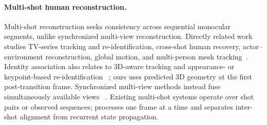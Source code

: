 \paragraph{Multi-shot human reconstruction.}
Multi-shot reconstruction seeks consistency across sequential monocular
segments, unlike synchronized multi-view reconstruction. Directly related work
studies TV-series tracking and re-identification, cross-shot human recovery,
actor--environment reconstruction, global motion, and multi-person mesh
tracking~\citep{pavlakos2022tvtracking,pavlakos2022multishot,pavlakos2022tvreconstruction,zhang2025humanmm,on2026multithumbs,kim2025showmak3r}.
Identity association also relates to 3D-aware tracking and appearance- or
keypoint-based re-identification
~\citep{rajasegaran2022phalp,he2021transreid,yuan2025pose2id,somers2024kpr}; ours
uses predicted 3D geometry at the first post-transition frame. Synchronized
multi-view methods instead fuse simultaneously available views
~\citep{rojas2025hamst3r,yang2026feedforward,liu2026trophies}. Existing
multi-shot systems operate over shot pairs or observed sequences; \method{}
processes one frame at a time and separates inter-shot alignment from recurrent
state propagation.
